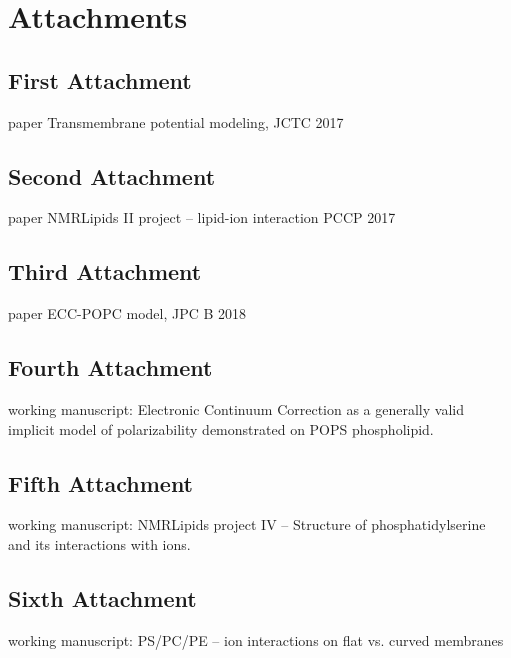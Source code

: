 \documentclass[12pt,a4paper]{report}
\let\openright=\clearpage
\begin{document}
\chapter{Attachments}

\section{First Attachment}
 paper Transmembrane potential modeling, JCTC 2017
\section{Second Attachment}
 paper NMRLipids II project -- lipid-ion interaction PCCP 2017
\section{Third Attachment}
 paper ECC-POPC model, JPC B 2018
\section{Fourth Attachment}
 working manuscript: Electronic Continuum Correction as a generally valid implicit model of polarizability demonstrated on POPS phospholipid.
\section{Fifth Attachment}
 working manuscript: NMRLipids project IV -- Structure of phosphatidylserine and its interactions with ions.
\section{Sixth Attachment}
 working manuscript: PS/PC/PE -- ion interactions on flat vs. curved membranes

\openright
\end{document}
